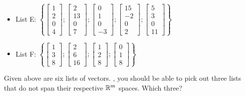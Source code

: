 \begin{itemize}
\item
List E: $\left\{ \left[ \begin{array}{c} 1 \\ 2 \\ 0 \\ 4\end{array} \right] ; 
\left[ \begin{array}{c} 2 \\ 13 \\ 0 \\ 7\end{array} \right] ; 
\left[ \begin{array}{c} 0 \\ 1 \\ 0 \\ -3\end{array} \right] ; 
\left[ \begin{array}{c} 15 \\ -2 \\ 0 \\ 2\end{array} \right] ; 
\left[ \begin{array}{c} 5 \\ 3 \\ 0 \\ 11\end{array} \right]  \right\}$



\item
List F: $\left\{ \left[ \begin{array}{c} 1 \\ 3 \\ 8 \end{array} \right] ; 
\left[ \begin{array}{c} 2 \\ 6 \\ 16 \end{array} \right] ;
\left[ \begin{array}{c} 1 \\ 2 \\ 8 \end{array} \right] ; 
\left[ \begin{array}{c} 0 \\ 1 \\ 8 \end{array} \right] \right\} $
\end{itemize}

Given above are six lists of vectors.  {}, you should be able to pick out three lists
that do not span their respective $\mathbb R^m$ spaces.  Which three?  




\edXsolution{  }

\endedxproblem



\endedxvertical
